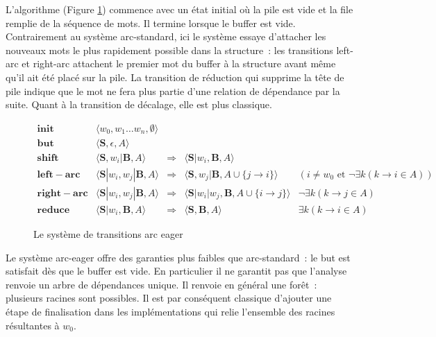 \documentclass[11pt,openany]{book}
\begin{document}
L'algorithme (Figure \ref{fig-AE}) commence avec un état initial où la
pile est vide et la file remplie de la séquence de mots. Il termine
lorsque le buffer est vide. Contrairement au système arc-standard, ici
le système essaye d'attacher les nouveaux mots le plus rapidement possible dans
la structure~: les transitions left-arc et right-arc attachent le
premier mot du buffer à la structure avant même qu'il ait été placé
sur la pile. La transition de réduction qui supprime la tête de pile
indique que le mot ne fera plus partie d'une relation de dépendance
par la suite.  Quant à la transition de décalage, elle est plus classique. 
\begin{figure}[htbp]
\begin{displaymath}
\begin{array}{rccll}
\mathbf{init}  &\langle w_0 ,  w_1 \ldots w_n ,\emptyset \rangle\\
\mathbf{but}  & \langle \mathbf{S} ,\epsilon , A \rangle\\
\mathbf{shift} & \langle \mathbf{S} ,  w_i | \mathbf{B} , A   \rangle
&\Rightarrow &\langle \mathbf{S} | w_i ,  \mathbf{B} , A   \rangle\\
\mathbf{left-arc} &\langle \mathbf{S}| w_i , w_j|\mathbf{B} , A
\rangle &\Rightarrow& \langle \mathbf{S}, w_j | \mathbf{B} , A \cup \{
j\rightarrow i \}   \rangle & (i\not = w_0 \text{ et } \lnot \exists k
(k\rightarrow i \in A) )\\
\mathbf{right-arc }  &\langle \mathbf{S}|w_i , w_j | \mathbf{B} , A   \rangle
&\Rightarrow & 
\langle \mathbf{S}| w_i | w_j , \mathbf{B} , A \cup \{
i \rightarrow j \}   \rangle
&\lnot\exists k (k\rightarrow j \in A)\\
\mathbf{reduce}&\langle \mathbf{S}|w_i , \mathbf{B} , A   \rangle
&\Rightarrow & 
\langle \mathbf{S} , \mathbf{B} , A   \rangle & 
\exists k (k\rightarrow i \in A)
\end{array}
\end{displaymath}
\caption{\label{fig-AE}Le système de transitions arc eager}
\end{figure}

Le système arc-eager offre des garanties plus faibles que
arc-standard~: le but est satisfait dès que le buffer est vide. 
En particulier il ne garantit pas que l'analyse renvoie
un arbre de dépendances unique. Il renvoie en général une forêt~:
plusieurs racines sont possibles. Il est par conséquent classique
d'ajouter une étape de finalisation dans les implémentations qui
relie l'ensemble des racines résultantes à $w_0$.
\end{document}
